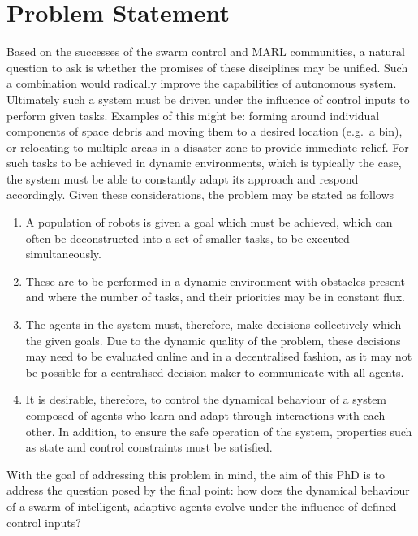 \documentclass[.../main.tex]{subfiles}
\begin{document}
    \section{Problem Statement} \label{sec::Problem_Statement}

    Based on the successes of the swarm control and MARL communities,
    a natural question to ask is whether the promises of these
    disciplines may be unified. Such a combination would radically
    improve the capabilities of autonomous system. Ultimately such a
    system must be driven under the influence of control inputs to
    perform given tasks. Examples of this might be: forming around
    individual components of space debris and moving them to a desired
    location (e.g.~a bin), or relocating to multiple areas in a
    disaster zone to provide immediate relief. For such tasks to be
    achieved in dynamic environments, which is typically the case, the
    system must be able to constantly adapt its approach and respond
    accordingly. Given these considerations, the problem may be stated
    as follows

    \begin{enumerate}
    	\item A population of robots is given a goal which must be
          achieved, which can often be deconstructed into a set of
          smaller tasks, to be executed simultaneously.
    	\item These are to be performed in a dynamic environment with
          obstacles present and where the number of tasks, and their
          priorities may be in constant flux.
    	\item The agents in the system must, therefore, make decisions
          collectively which  the given
          goals. Due to the dynamic quality of the problem, these
          decisions may need to be evaluated online and in a
          decentralised fashion, as it may not be possible for a
          centralised decision maker to communicate with all agents.
    	\item It is desirable, therefore, to control the dynamical
          behaviour of a system composed of agents who learn and adapt
          through interactions with each other. In addition, to ensure
          the safe operation of the system, properties such as state
          and control constraints must be satisfied.
    \end{enumerate}


    With the goal of addressing this problem in mind, the aim of this PhD is to address the question
    posed by the final point: how does the dynamical behaviour of a swarm of intelligent, adaptive
    agents evolve under the influence of defined control inputs?
\end{document}
